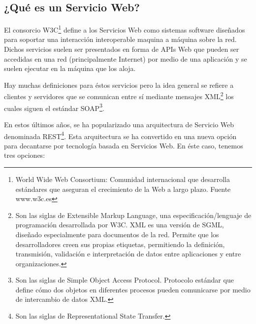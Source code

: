 \subsection{¿Qué es un Servicio Web?}
El consorcio W3C\footnote[1]{World Wide Web Consortium: Comunidad internacional que desarrolla estándares que aseguran el crecimiento de la Web a largo plazo. Fuente www.w3c.es} define a los Servicios Web como sistemas software diseñados para soportar una interacción interoperable maquina a máquina sobre la red. Dichos servicios suelen ser presentados en forma de APIs Web que pueden ser accedidas en una red (principalmente Internet) por medio de una aplicación y se suelen ejecutar en la máquina que los aloja.
\bigskip
\par
Hay muchas definiciones para éstos servicios pero la idea general se refiere a clientes  y servidores que se comunican entre sí mediante mensajes XML\footnote[2]{Son las siglas de Extensible Markup Language, una especificación/lenguaje de programación desarrollada por W3C. XML es una versión de SGML, diseñado especialmente para documentos de la red. Permite que los desarrolladores creen sus propias etiquetas, permitiendo la definición, transmisión, validación e interpretación de datos entre aplicaciones y entre organizaciones.} los cuales siguen el estándar SOAP\footnote[3]{Son las siglas de Simple Object Access Protocol. Protocolo estándar que define cómo dos objetos en diferentes procesos pueden comunicarse por medio de intercambio de datos XML.}.
\bigskip
\par
En estos últimos años, se ha popularizado una arquitectura de Servicio Web denominada REST\footnote[4]{Son las siglas de Representational State Transfer.}. Esta arquitectura se ha convertido en una nueva opción para decantarse por tecnología basada en Servicios Web. En éste caso, tenemos tres opciones:
